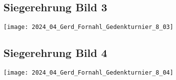 \documentclass[a4paper,ngerman]{tui-algo-seminar}
\begin{document}
\subsection{Siegerehrung Bild 3}
\begin{center}
    \texttt{[image: 2024\_04\_Gerd\_Fornahl\_Gedenkturnier\_8\_03]}
    \label{fig:gerd_fornahl_3}
\end{center}

\subsection{Siegerehrung Bild 4}
\begin{center}
    \texttt{[image: 2024\_04\_Gerd\_Fornahl\_Gedenkturnier\_8\_04]}
    \label{fig:gerd_fornahl_4}
\end{center}
\end{document}
